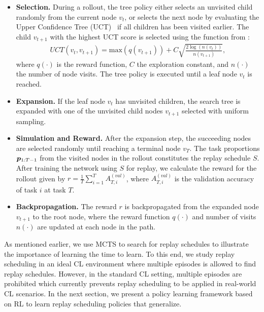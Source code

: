 \begin{itemize}[topsep=1pt, itemsep=1pt, label={}, leftmargin=*]
	\item {\bf Selection.} During a rollout, the tree policy either selects an unvisited child randomly from the current node $v_t$, or selects the next node by evaluating the Upper Confidence Tree (UCT)~\cite{kocsis2006bandit} if all children has been visited earlier.
	The child $v_{t+1}$ with the highest UCT score is selected using the function from \cite{chaudhry2018feature}:
	\begin{align}\label{eq:uct}
		UCT(v_t, v_{t+1}) = \text{max}(q(v_{t+1})) + C \sqrt{\frac{2 \log(n(v_{t}))}{n(v_{t+1})}},
	\end{align}
	where $q(\cdot)$ is the reward function, $C$ the exploration constant, and $n(\cdot)$ the number of node visits. The tree policy is executed until a leaf node $v_t$ is reached.
	
	\item {\bf Expansion.} If the leaf node $v_t$ has unvisited children, the search tree is expanded with one of the unvisited child nodes $v_{t+1}$ selected with uniform sampling. 
	
	\item {\bf Simulation and Reward.} After the expansion step, the succeeding nodes are selected randomly until reaching a terminal node $v_T$. The task proportions ${\bm{p}}_{1:T-1}$ from the visited nodes in the rollout constitutes the replay schedule $S$. After training the network using $S$ for replay, we calculate the reward for the rollout given by $r = \frac{1}{T} \sum_{i=1}^T A_{T, i}^{(val)}$, where $A_{T, i}^{(val)}$ is the validation accuracy of task $i$ at task $T$.  
	
	\item {\bf Backpropagation.} The reward $r$ is backpropagated from the expanded node $v_{t+1}$ to the root node, where the reward function $q(\cdot)$ and number of visits $n(\cdot)$ are updated at each node in the path. 
\end{itemize}
As mentioned earlier, we use MCTS to search for replay schedules to illustrate the importance of learning the time to learn. To this end, we study replay scheduling in an ideal CL environment where multiple episodes is allowed to find replay schedules. However, in the standard CL setting, multiple episodes are prohibited which currently prevents replay scheduling to be applied in real-world CL scenarios. In the next section, we present a policy learning framework based on RL to learn replay scheduling policies that generalize. 


